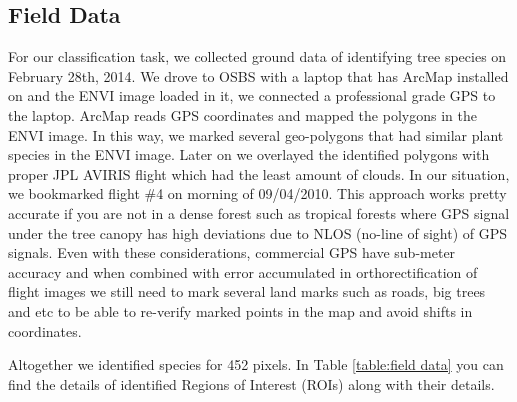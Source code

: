 \documentclass[remotesensing,article,accept,moreauthors,pdftex,12pt,a4paper]{mdpi}
\begin{document}
\subsection{Field Data}


For our classification task, we collected ground data of identifying tree species on February 28th, 2014. We drove to OSBS with a laptop that has ArcMap installed on and the ENVI image loaded in it, we connected a professional grade GPS to the laptop. ArcMap reads GPS coordinates and mapped the polygons in the ENVI image. In this way, we marked several geo-polygons that had similar plant species in the ENVI image. Later on we overlayed the identified polygons with proper JPL AVIRIS flight which had the least amount of clouds. In our situation, we bookmarked flight \#4 on morning of 09/04/2010. This approach works pretty accurate if you are not in a dense forest such as tropical forests where GPS signal under the tree canopy has high deviations due to NLOS (no-line of sight) of GPS signals. Even with these considerations, commercial GPS have sub-meter accuracy and when combined with error accumulated in orthorectification of flight images we still need to mark several land marks such as roads, big trees and etc to be able to re-verify marked points in the map and avoid shifts in coordinates.

Altogether we identified species for 452 pixels. In Table \ref{table:field data} you can find the details of identified Regions of Interest (ROIs) along with their details. 







\end{document}

